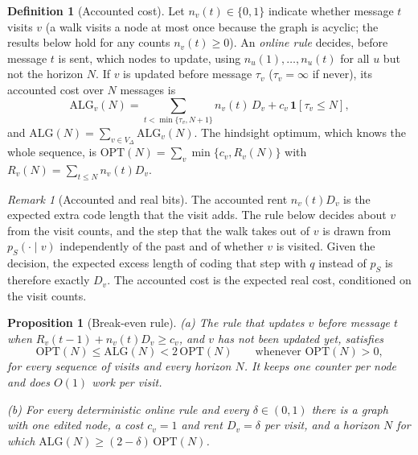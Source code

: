 \documentclass[11pt]{article}
\newtheorem{proposition}[theorem]{Proposition}
\theoremstyle{definition}
\newtheorem{definition}{Definition}
\theoremstyle{remark}
\newtheorem{remark}{Remark}
\newcommand{\ALG}{\mathrm{ALG}}
\newcommand{\OPT}{\mathrm{OPT}}
\begin{document}
\begin{definition}[Accounted cost]\label{def:acc}
Let $n_v(t)\in\{0,1\}$ indicate whether message $t$ visits $v$ (a walk visits a node at most once because the graph is acyclic; the results below hold for any counts $n_v(t)\ge0$). An \emph{online rule} decides, before message $t$ is sent, which nodes to update, using $n_u(1),\dots,n_u(t)$ for all $u$ but not the horizon $N$. If $v$ is updated before message $\tau_v$ ($\tau_v=\infty$ if never), its accounted cost over $N$ messages is
\[
\ALG_v(N)=\sum_{t<\min\{\tau_v,N+1\}}n_v(t)\,D_v+c_v\,\mathbf 1[\tau_v\le N],
\]
and $\ALG(N)=\sum_{v\in V_\Delta}\ALG_v(N)$. The hindsight optimum, which knows the whole sequence, is $\OPT(N)=\sum_v\min\{c_v,R_v(N)\}$ with $R_v(N)=\sum_{t\le N}n_v(t)D_v$.
\end{definition}

\begin{remark}[Accounted and real bits]\label{rem:acc}
The accounted rent $n_v(t)D_v$ is the expected extra code length that the visit adds. The rule below decides about $v$ from the visit counts, and the step that the walk takes out of $v$ is drawn from $p_S(\cdot\mid v)$ independently of the past and of whether $v$ is visited. Given the decision, the expected excess length of coding that step with $q$ instead of $p_S$ is therefore exactly $D_v$. The accounted cost is the expected real cost, conditioned on the visit counts.
\end{remark}

\begin{proposition}[Break-even rule]\label{prop:c2}
\textup{(a)} The rule that updates $v$ before message $t$ when $R_v(t-1)+n_v(t)D_v\ge c_v$, and $v$ has not been updated yet, satisfies
\[
\OPT(N)\le\ALG(N)<2\,\OPT(N)\qquad\text{whenever }\OPT(N)>0,
\]
for every sequence of visits and every horizon $N$. It keeps one counter per node and does $O(1)$ work per visit.

\textup{(b)} For every deterministic online rule and every $\delta\in(0,1)$ there is a graph with one edited node, a cost $c_v=1$ and rent $D_v=\delta$ per visit, and a horizon $N$ for which $\ALG(N)\ge(2-\delta)\,\OPT(N)$.
\end{proposition}
\end{document}
